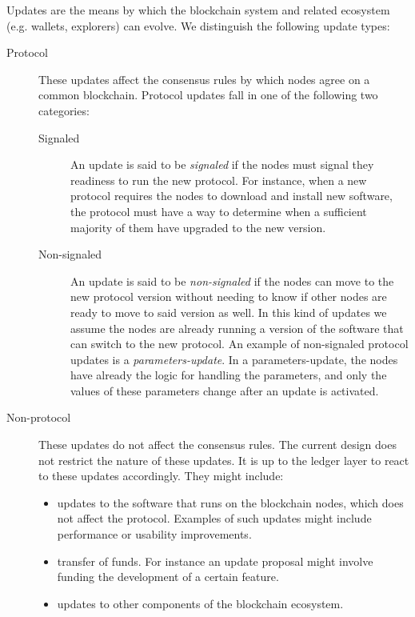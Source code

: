 \documentclass[11pt,a4paper]{article}
\begin{document}
Updates are the means by which the blockchain system and related ecosystem (e.g.
wallets, explorers) can evolve. We distinguish the following update types:
\begin{description}
\item[Protocol] These updates affect the consensus rules by which nodes agree on
  a common blockchain. Protocol updates fall in one of the following two
  categories:
  \begin{description}
  \item[Signaled] An update is said to be \emph{signaled} if the nodes must
    signal they readiness to run the new protocol. For instance, when a new
    protocol requires the nodes to download and install new software, the
    protocol must have a way to determine when a sufficient majority of them
    have upgraded to the new version.
  \item[Non-signaled] An update is said to be \emph{non-signaled} if the nodes
    can move to the new protocol version without needing to know if other nodes
    are ready to move to said version as well. In this kind of updates we assume
    the nodes are already running a version of the software that can switch to
    the new protocol. An example of non-signaled protocol updates is a
    \emph{parameters-update}. In a parameters-update, the nodes have already the
    logic for handling the parameters, and only the values of these parameters
    change after an update is activated.
  \end{description}
\item[Non-protocol] These updates do not affect the consensus rules. The current
  design does not restrict the nature of these updates. It is up to the ledger
  layer to react to these updates accordingly. They might include:
  \begin{itemize}
  \item updates to the software that runs on the blockchain nodes, which does
    not affect the protocol. Examples of such updates might include performance
    or usability improvements.
  \item transfer of funds. For instance an update proposal might involve funding
    the development of a certain feature.
  \item updates to other components of the blockchain ecosystem.
  \end{itemize}
\end{description}
\end{document}
